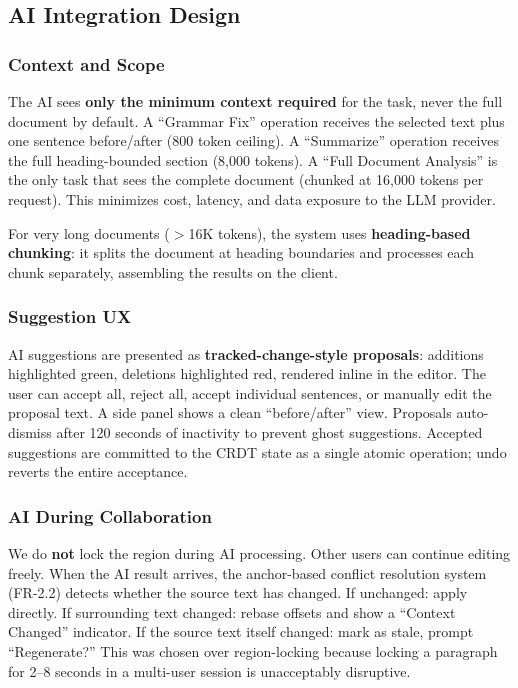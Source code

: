 \documentclass[10pt, a4paper]{article}
\begin{document}
\subsection{AI Integration Design}

\subsubsection{Context and Scope}
The AI sees \textbf{only the minimum context required} for the task, never the full document by default. A ``Grammar Fix'' operation receives the selected text plus one sentence before/after (800 token ceiling). A ``Summarize'' operation receives the full heading-bounded section (8,000 tokens). A ``Full Document Analysis'' is the only task that sees the complete document (chunked at 16,000 tokens per request). This minimizes cost, latency, and data exposure to the LLM provider.

For very long documents ($>$16K tokens), the system uses \textbf{heading-based chunking}: it splits the document at heading boundaries and processes each chunk separately, assembling the results on the client.

\subsubsection{Suggestion UX}
AI suggestions are presented as \textbf{tracked-change-style proposals}: additions highlighted green, deletions highlighted red, rendered inline in the editor. The user can accept all, reject all, accept individual sentences, or manually edit the proposal text. A side panel shows a clean ``before/after'' view. Proposals auto-dismiss after 120 seconds of inactivity to prevent ghost suggestions. Accepted suggestions are committed to the CRDT state as a single atomic operation; undo reverts the entire acceptance.

\subsubsection{AI During Collaboration}
We do \textbf{not} lock the region during AI processing. Other users can continue editing freely. When the AI result arrives, the anchor-based conflict resolution system (FR-2.2) detects whether the source text has changed. If unchanged: apply directly. If surrounding text changed: rebase offsets and show a ``Context Changed'' indicator. If the source text itself changed: mark as stale, prompt ``Regenerate?'' This was chosen over region-locking because locking a paragraph for 2--8 seconds in a multi-user session is unacceptably disruptive.
\end{document}
